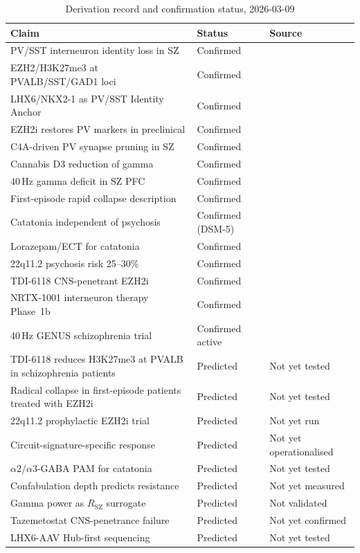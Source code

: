 \documentclass[12pt,a4paper]{article}
\newcommand{\RSZ}{R_{\mathrm{SZ}}}
\begin{document}
\begin{table}[ht!]
\centering
\caption{Derivation record and confirmation status,
  2026-03-09}
\label{tab:record}
\begin{tabular}{p{5.2cm}p{2.2cm}p{4.0cm}}
\toprule
\textbf{Claim} & \textbf{Status} & \textbf{Source} \\
\midrule
PV/SST interneuron identity loss in SZ &
Confirmed & \cite{Hashimoto2003,Gonzalez2018} \\
EZH2/H3K27me3 at PVALB/SST/GAD1 loci &
Confirmed & \cite{Ruzicka2024,Zhubi2014} \\
LHX6/NKX2-1 as PV/SST Identity Anchor &
Confirmed & \cite{Maroof2013} \\
EZH2i restores PV markers in preclinical &
Confirmed & \cite{EZH2iSZ2023} \\
C4A-driven PV synapse pruning in SZ &
Confirmed & \cite{Sekar2016} \\
Cannabis D3 reduction of gamma &
Confirmed & \cite{Murray2017} \\
40\,Hz gamma deficit in SZ PFC &
Confirmed & \cite{Uhlhaas2010} \\
First-episode rapid collapse description &
Confirmed & \cite{Kapur2003} \\
Catatonia independent of psychosis &
Confirmed (DSM-5) & \cite{DSM5_2013,Fink2003} \\
Lorazepam/ECT for catatonia &
Confirmed & \cite{Sienaert2014,Gazdag2009} \\
22q11.2 psychosis risk 25--30\% &
Confirmed & \cite{Bassett2011} \\
TDI-6118 CNS-penetrant EZH2i &
Confirmed & \cite{TDI6118} \\
NRTX-1001 interneuron therapy Phase~1b &
Confirmed & \cite{NRTX1001} \\
40\,Hz GENUS schizophrenia trial &
Confirmed active & \cite{GENUS_SZ_trial} \\
\midrule
TDI-6118 reduces H3K27me3 at PVALB
in schizophrenia patients &
Predicted & Not yet tested \\
Radical collapse in first-episode
patients treated with EZH2i &
Predicted & Not yet tested \\
22q11.2 prophylactic EZH2i trial &
Predicted & Not yet run \\
Circuit-signature-specific response &
Predicted & Not yet operationalised \\
$\alpha$2/$\alpha$3-GABA PAM for catatonia &
Predicted & Not yet tested \\
Confabulation depth predicts resistance &
Predicted & Not yet measured \\
Gamma power as $\RSZ$ surrogate &
Predicted & Not validated \\
Tazemetostat CNS-penetrance failure &
Predicted & Not yet confirmed \\
LHX6-AAV Hub-first sequencing &
Predicted & Not yet tested \\
\bottomrule
\end{tabular}
\end{table}
\end{document}
